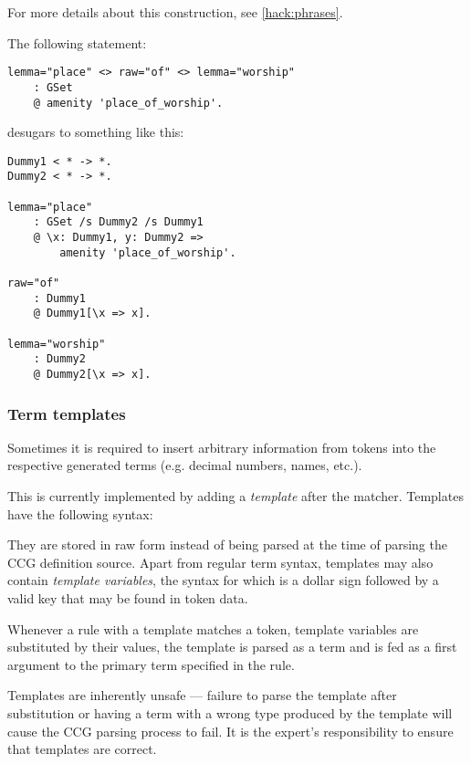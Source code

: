\documentclass[main.tex]{subfiles}
\begin{document}
For more details about this construction, see \cref{hack:phrases}.

\begin{mexample}
The following statement:
\begin{lstwrap}\begin{lstlisting}
lemma="place" <> raw="of" <> lemma="worship"
    : GSet
    @ amenity 'place_of_worship'.
\end{lstlisting}\end{lstwrap}

desugars to something like this:
\begin{lstwrap}\begin{lstlisting}
Dummy1 < * -> *.
Dummy2 < * -> *.

lemma="place"
    : GSet /s Dummy2 /s Dummy1
    @ \x: Dummy1, y: Dummy2 =>
        amenity 'place_of_worship'.

raw="of"
    : Dummy1
    @ Dummy1[\x => x].

lemma="worship"
    : Dummy2
    @ Dummy2[\x => x].
\end{lstlisting}\end{lstwrap}
\end{mexample}

\subsubsection{Term templates}
Sometimes it is required to insert arbitrary information from tokens into
the respective generated terms (e.g. decimal numbers, names, etc.).

This is currently implemented by adding a \emph{template} after the
matcher. Templates have the following syntax:
\begin{center}
\end{center}

They are stored in raw form instead of being
parsed at the time of parsing the
CCG definition source. Apart from regular term syntax, templates may also
contain \emph{template variables}, the syntax for which is a dollar sign
followed by a valid key that may be found in token data.

Whenever a rule with a template matches a token, template variables are
substituted by their values, the template is parsed as a term and is fed
as a first argument to the primary term specified in the rule.

Templates are inherently unsafe --- failure to parse the template after substitution
or having a term with a wrong type produced by the template will cause the
CCG parsing process to fail. It is the expert's responsibility to ensure that
templates are correct.
\end{document}
